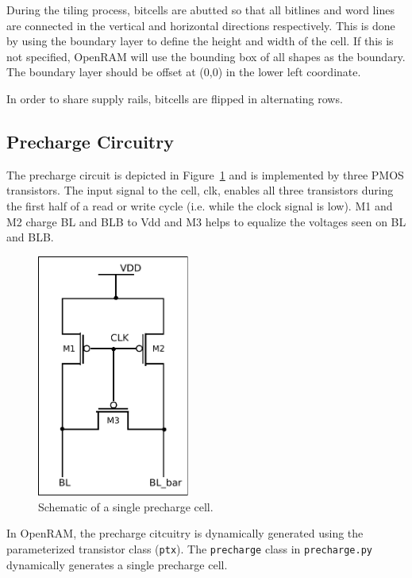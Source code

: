 During the tiling process, bitcells are abutted so that all bitlines
and word lines are connected in the vertical and horizontal directions
respectively. This is done by using the boundary layer to define the
height and width of the cell. If this is not specified, OpenRAM will
use the bounding box of all shapes as the boundary. The boundary layer
should be offset at (0,0) in the lower left coordinate.

In order to share supply rails, bitcells are flipped in alternating
rows. 



\subsection{Precharge Circuitry}
\label{sec:precharge}

The precharge circuit is depicted in Figure~\ref{fig:precharge} and is
implemented by three PMOS transistors. The input signal to the cell,
clk, enables all three transistors during the first half of a read or
write cycle (i.e. while the clock signal is low).  M1 and M2 charge BL
and BLB to Vdd and M3 helps to equalize the voltages seen on BL and
BLB.

\begin{figure}[h!]
\centering
\includegraphics[width=5cm]{./figs/precharge_schem.pdf}
\caption{Schematic of a single precharge cell. }
\label{fig:precharge}
\end{figure}

In OpenRAM, the precharge citcuitry is dynamically generated using the
parameterized transistor class (\verb|ptx|). The \verb|precharge|
class in \verb|precharge.py| dynamically generates a single precharge cell.

